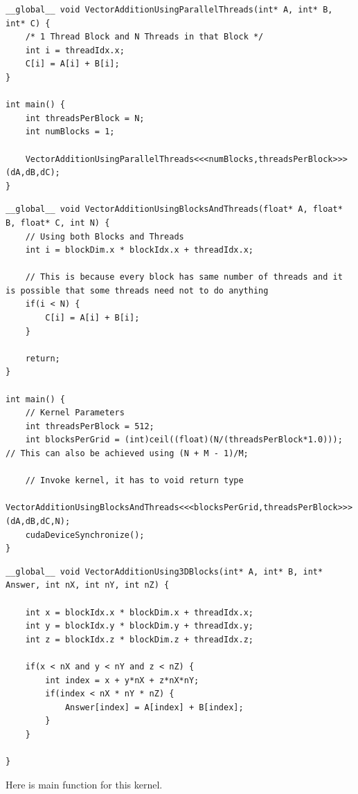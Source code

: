 \documentclass{article}
\begin{document}
\begin{lstlisting}
__global__ void VectorAdditionUsingParallelThreads(int* A, int* B, int* C) {
    /* 1 Thread Block and N Threads in that Block */
    int i = threadIdx.x;
    C[i] = A[i] + B[i];
}

int main() {
    int threadsPerBlock = N;
    int numBlocks = 1;

    VectorAdditionUsingParallelThreads<<<numBlocks,threadsPerBlock>>> (dA,dB,dC);
}
\end{lstlisting}


\begin{lstlisting}
__global__ void VectorAdditionUsingBlocksAndThreads(float* A, float* B, float* C, int N) {
    // Using both Blocks and Threads
    int i = blockDim.x * blockIdx.x + threadIdx.x;
    
    // This is because every block has same number of threads and it is possible that some threads need not to do anything
    if(i < N) {
        C[i] = A[i] + B[i];
    }

    return;
}

int main() {
    // Kernel Parameters
    int threadsPerBlock = 512;
    int blocksPerGrid = (int)ceil((float)(N/(threadsPerBlock*1.0))); // This can also be achieved using (N + M - 1)/M;

    // Invoke kernel, it has to void return type
    VectorAdditionUsingBlocksAndThreads<<<blocksPerGrid,threadsPerBlock>>> (dA,dB,dC,N);
    cudaDeviceSynchronize(); 
}
\end{lstlisting}


\begin{lstlisting}
__global__ void VectorAdditionUsing3DBlocks(int* A, int* B, int* Answer, int nX, int nY, int nZ) {
    
    int x = blockIdx.x * blockDim.x + threadIdx.x;
    int y = blockIdx.y * blockDim.y + threadIdx.y;
    int z = blockIdx.z * blockDim.z + threadIdx.z;

    if(x < nX and y < nY and z < nZ) {
        int index = x + y*nX + z*nX*nY;
        if(index < nX * nY * nZ) {
            Answer[index] = A[index] + B[index];
        }
    }

}
\end{lstlisting}

Here is main function for this kernel.
\end{document}
